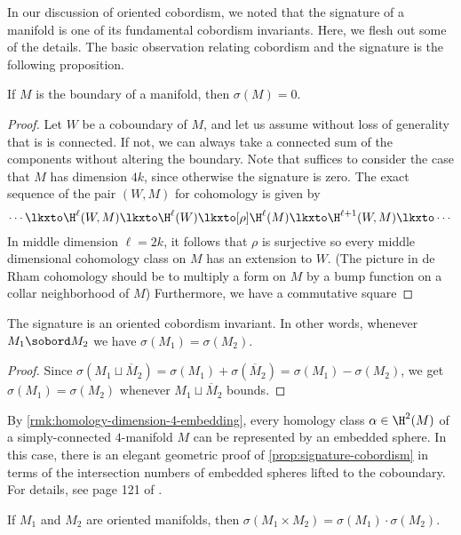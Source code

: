 In our discussion of oriented cobordism, we noted that the signature of a manifold is one of its fundamental cobordism invariants. Here, we flesh out some of the details. The basic observation relating cobordism and the signature is the following proposition.

\begin{proposition}\label{prop:signature-cobordism}
	If $M$ is the boundary of a manifold, then $\sigma(M)=0$.
\end{proposition}
\begin{proof}
	Let $W$ be a coboundary of $M$, and let us assume without loss of generality that is is connected. If not, we can always take a connected sum of the components without altering the boundary. Note that suffices to consider the case that $M$ has dimension $4k$, since otherwise the signature is zero. The exact sequence of the pair $(W,M)$ for cohomology is given by
	\[
		\cdots \lkxto \H^\ell(W,M)\lkxto \H^\ell(W)\lkxto[\rho] \H^{\ell}(M)\lkxto \H^{\ell+1}(W,M)\lkxto\cdots
	\]
	In middle dimension $\ell=2k$, it follows that $\rho$ is surjective so every middle dimensional cohomology class on $M$ has an extension to $W$. (The picture in de Rham cohomology should be to multiply a form on $M$ by a bump function on a collar neighborhood of $M$) Furthermore, we have a commutative square
\end{proof}

\begin{corollary}
	The signature is an oriented cobordism invariant. In other words, whenever $M_1\sobord M_2$ we have $\sigma(M_1)=\sigma(M_2)$.
\end{corollary}
\begin{proof}
Since $\sigma(M_1\sqcup\overline{M}_2)=\sigma(M_1)+\sigma(\overline{M}_2)=\sigma(M_1)-\sigma(M_2)$, we get $\sigma(M_1)=\sigma(M_2)$ whenever $M_1\sqcup \overline{M}_2$ bounds.
\end{proof}

\begin{remark}
	By \cref{rmk:homology-dimension-4-embedding}, every homology class $\alpha\in \H^2(M)$ of a simply-connected $4$-manifold $M$ can be represented by an embedded sphere. In this case, there is an elegant geometric proof of \cref{prop:signature-cobordism} in terms of the intersection numbers of embedded spheres lifted to the coboundary. For details, see page 121 of \cite{scorpan2005wild}.
\end{remark}

\begin{proposition}
	If $M_1$ and $M_2$ are oriented manifolds, then $\sigma(M_1\times M_2)=\sigma(M_1)\cdot \sigma(M_2)$.
\end{proposition}

